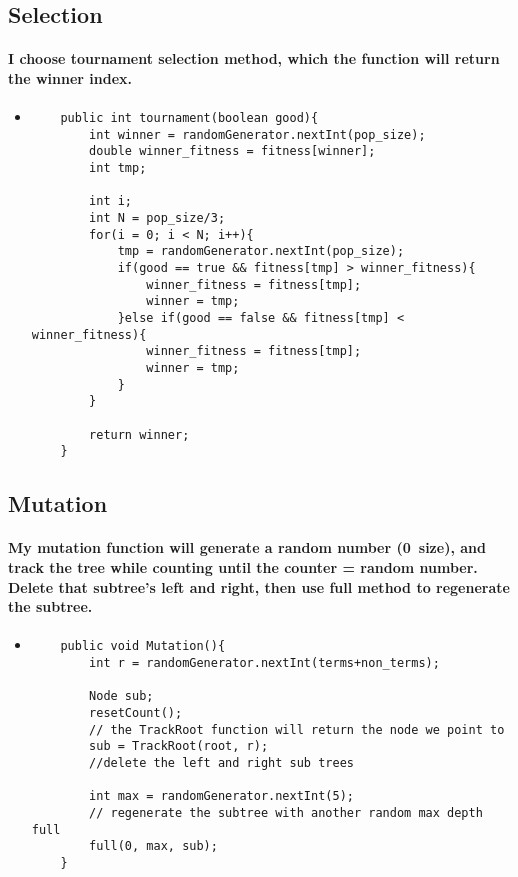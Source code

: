 \documentclass[12pt]{article}
\begin{document}
	\subsection{Selection}
	\paragraph{I choose tournament selection method, which the function will return the winner index.}
	\begin{itemize}
	\item
	\begin{lstlisting}
    public int tournament(boolean good){
        int winner = randomGenerator.nextInt(pop_size);
        double winner_fitness = fitness[winner];
        int tmp;
        
        int i;
        int N = pop_size/3;
        for(i = 0; i < N; i++){
            tmp = randomGenerator.nextInt(pop_size);
            if(good == true && fitness[tmp] > winner_fitness){
                winner_fitness = fitness[tmp];
                winner = tmp;
            }else if(good == false && fitness[tmp] < winner_fitness){
                winner_fitness = fitness[tmp];
                winner = tmp;
            }
        }
        
        return winner;
    }
	\end{lstlisting}
	\end{itemize}
	
	\subsection{Mutation}
	\paragraph{My mutation function will generate a random number (0~size), and track the tree while counting until the counter = random number. Delete that subtree's left and right, then use full method to regenerate the subtree.}
	\begin{itemize}
	\item
	\begin{lstlisting}
    public void Mutation(){
        int r = randomGenerator.nextInt(terms+non_terms);
        
        Node sub;
        resetCount();
        // the TrackRoot function will return the node we point to
        sub = TrackRoot(root, r);
        //delete the left and right sub trees
        
        int max = randomGenerator.nextInt(5);
        // regenerate the subtree with another random max depth full
        full(0, max, sub);
    }
	\end{lstlisting}
	\end{itemize}
	
\end{document}
